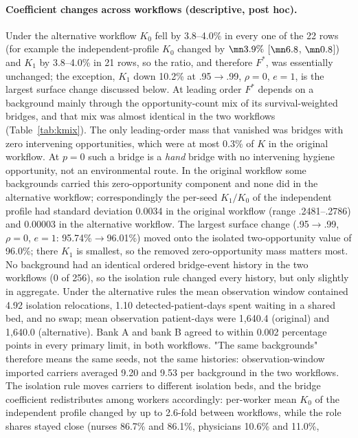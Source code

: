 \paragraph{Coefficient changes across workflows (descriptive, post hoc).} Under the
alternative workflow $K_0$ fell by 3.8--4.0\% in every one of the 22 rows (for
example the independent-profile $K_0$ changed by $\mn3.9\%$ [$\mn6.8$,
$\mn0.8$]) and $K_1$ by 3.8--4.0\% in 21 rows, so the ratio, and therefore
$F^*$, was essentially unchanged; the exception, $K_1$ down 10.2\% at
.95$\to$.99, $\rho=0$, $e=1$, is the largest surface change discussed below. At leading order $F^*$
depends on a background mainly through the opportunity-count mix of its
survival-weighted bridges, and that mix was almost identical in the two workflows
(Table~\ref{tab:kmix}). The only leading-order mass that vanished was bridges
with zero intervening opportunities, which were at most 0.3\% of $K$ in the
original workflow. At $p=0$ such a bridge is a \emph{hand} bridge with no
intervening hygiene opportunity, not an environmental route. In the original
workflow some backgrounds carried this zero-opportunity component and none did in
the alternative workflow; correspondingly the per-seed $K_1/K_0$ of the
independent profile had standard deviation 0.0034 in the original workflow
(range .2481--.2786) and 0.00003 in the alternative workflow. The largest surface
change (.95$\to$.99, $\rho=0$, $e=1$: 95.74\%$\to$96.01\%) moved onto the
isolated two-opportunity value of 96.0\%; there $K_1$ is smallest, so the
removed zero-opportunity mass matters most. No background had an identical
ordered bridge-event history in the two workflows (0 of 256), so the isolation
rule changed every history, but only slightly in aggregate. Under the
alternative rules the mean observation window contained 4.92 isolation
relocations, 1.10 detected-patient-days spent waiting in a shared bed, and no
swap; mean observation patient-days were 1,640.4 (original) and 1,640.0
(alternative). Bank A and bank B agreed to within 0.002 percentage points in
every primary limit, in both workflows. "The same backgrounds" therefore means
the same seeds, not the same histories: observation-window imported carriers
averaged 9.20 and 9.53 per background in the two workflows. The
isolation rule moves carriers to different isolation beds, and the bridge
coefficient redistributes among workers accordingly: per-worker mean $K_0$ of
the independent profile changed by up to 2.6-fold between workflows, while the
role shares stayed close (nurses 86.7\% and 86.1\%, physicians 10.6\% and 11.0\%,
